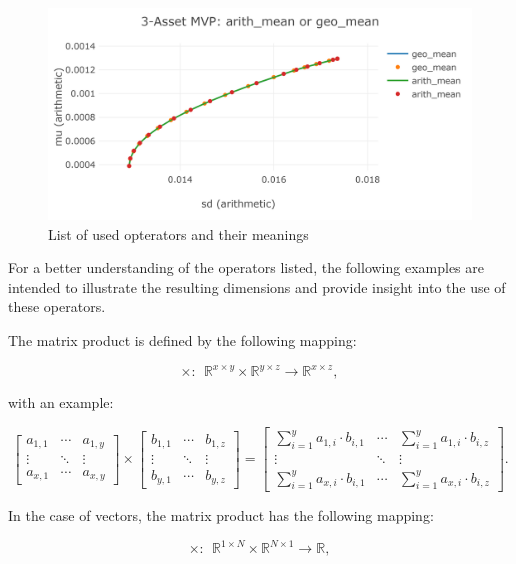 \documentclass[
  oneside, a4paper, 12pt, openany]{book}
\theoremstyle{definition}
\theoremstyle{definition}
\theoremstyle{definition}
\theoremstyle{definition}
\theoremstyle{remark}
\begin{document}
\begin{figure}[H]
\includegraphics{Master_Thesis_files/figure-latex/unnamed-chunk-4-1} \caption{List of used opterators and their meanings}\label{fig:unnamed-chunk-4}
\end{figure}

For a better understanding of the operators listed, the following examples are intended to illustrate the resulting dimensions and provide insight into the use of these operators.

The matrix product is defined by the following mapping:

\[\times: \ \ \mathbb{R}^{x \times y} \times \mathbb{R}^{y \times z} \rightarrow \mathbb{R}^{x \times z},\]

with an example:

\[ 
\begin{bmatrix}a_{1,1} &\cdots  & a_{1,y} \\ \vdots & \ddots & \vdots  \\ a_{x,1} & \cdots & a_{x,y} \end{bmatrix}
\times
\begin{bmatrix}b_{1,1} &\cdots  & b_{1,z} \\ \vdots & \ddots & \vdots  \\ b_{y,1} & \cdots & b_{y,z} \end{bmatrix}
=
\begin{bmatrix} \sum_{i=1}^y a_{1, i} \cdot  b_{i,1} &\cdots  & \sum_{i=1}^y a_{1, i} \cdot  b_{i,z} \\ \vdots & \ddots & \vdots  \\ \sum_{i=1}^y a_{x, i} \cdot  b_{i,1}  & \cdots & \sum_{i=1}^y a_{x, i} \cdot  b_{i,z} \end{bmatrix}.
\]

In the case of vectors, the matrix product has the following mapping:

\[\times: \ \ \mathbb{R}^{1 \times N} \times \mathbb{R}^{N \times 1} \rightarrow \mathbb{R},\]
\end{document}
